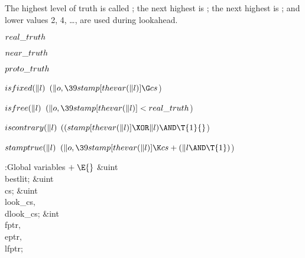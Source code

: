 The highest level of truth is called ; the next highest
is ; the next highest is ; and lower
values
2, 4, \dots,  are used during lookahead.

\Y\B\4\D$\\{real\_truth}$ \5
\par
\B\4\D$\\{near\_truth}$ \5
\par
\B\4\D$\\{proto\_truth}$ \5
\par
\B\4\D$\\{isfixed}(\|l)$ \5
$(\|o,\39\\{stamp}[\\{thevar}(\|l)]\G\\{cs}{}$)\par
\B\4\D$\\{isfree}(\|l)$ \5
$(\|o,\39\\{stamp}[\\{thevar}(\|l)]<\\{real\_truth}{}$)\par
\B\4\D$\\{iscontrary}(\|l)$ \5
$((\\{stamp}[\\{thevar}(\|l)]\XOR\|l)\AND\T{1}{}$)\par
\B\4\D$\\{stamptrue}(\|l)$ \5
$(\|o,\39\\{stamp}[\\{thevar}(\|l)]\K\\{cs}+(\|l\AND\T{1}){}$)\par
\Y\B\4:Global variables\X${}\mathrel+\E{}$\6
\&{uint} \\{bestlit};\6
\&{uint} \\{cs};\6
\&{uint} \\{look\_cs}${},{}$ \\{dlook\_cs};\6
\&{int} \\{fptr}${},{}$ \\{eptr}${},{}$ \\{lfptr};\par
\fi


